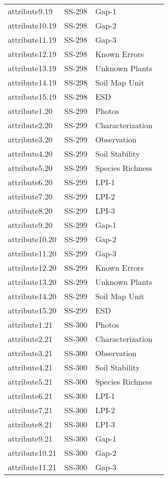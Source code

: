 \documentclass[
]{article}
\begin{document}
\begin{longtable}[]{@{}llll@{}}
attribute9.19 & SS-298 & Gap-1 & \\
attribute10.19 & SS-298 & Gap-2 & \\
attribute11.19 & SS-298 & Gap-3 & \\
attribute12.19 & SS-298 & Known Errors & \\
attribute13.19 & SS-298 & Unknown Plants & \\
attribute14.19 & SS-298 & Soil Map Unit & \\
attribute15.19 & SS-298 & ESD & \\
attribute1.20 & SS-299 & Photos & \\
attribute2.20 & SS-299 & Characterization & \\
attribute3.20 & SS-299 & Observation & \\
attribute4.20 & SS-299 & Soil Stability & \\
attribute5.20 & SS-299 & Species Richness & \\
attribute6.20 & SS-299 & LPI-1 & \\
attribute7.20 & SS-299 & LPI-2 & \\
attribute8.20 & SS-299 & LPI-3 & \\
attribute9.20 & SS-299 & Gap-1 & \\
attribute10.20 & SS-299 & Gap-2 & \\
attribute11.20 & SS-299 & Gap-3 & \\
attribute12.20 & SS-299 & Known Errors & \\
attribute13.20 & SS-299 & Unknown Plants & \\
attribute14.20 & SS-299 & Soil Map Unit & \\
attribute15.20 & SS-299 & ESD & \\
attribute1.21 & SS-300 & Photos & \\
attribute2.21 & SS-300 & Characterization & \\
attribute3.21 & SS-300 & Observation & \\
attribute4.21 & SS-300 & Soil Stability & \\
attribute5.21 & SS-300 & Species Richness & \\
attribute6.21 & SS-300 & LPI-1 & \\
attribute7.21 & SS-300 & LPI-2 & \\
attribute8.21 & SS-300 & LPI-3 & \\
attribute9.21 & SS-300 & Gap-1 & \\
attribute10.21 & SS-300 & Gap-2 & \\
attribute11.21 & SS-300 & Gap-3 & \\

\end{longtable}
\end{document}
